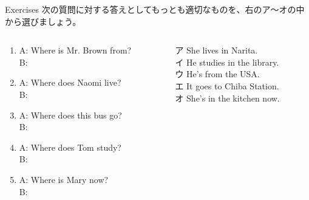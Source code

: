 \documentclass[aspectratio=169,xcolor={dvipsnames,table}]{beamer}
\begin{document}
\begin{frame}[plain]{Exercises}
 次の質問に対する答えとしてもっとも適切なものを、右のア～オの中から選びましょう。

\begin{columns}[t]
 \begin{column}{.475\textwidth}
\begin{enumerate}
 \item A: Where is Mr. Brown from?\\
B: 
 \item A: Where does Naomi live?\\
B: 
 \item A: Where does this bus go?\\
B: 
 \item A: Where does Tom study?\\
B: 
 \item A: Where is Mary now?\\
B: 
\end{enumerate}  
 \end{column}
\begin{column}{.475\textwidth}
\begin{tcolorbox}
ア She lives in Narita.\\
イ He studies in the library.\\
ウ He's from the USA.\\
エ It goes to Chiba Station.\\
オ She's in the kitchen now.
\end{tcolorbox} 
\mbox{}\hfill{}
\end{column}
\end{columns}

%


\end{frame}
\end{document}
